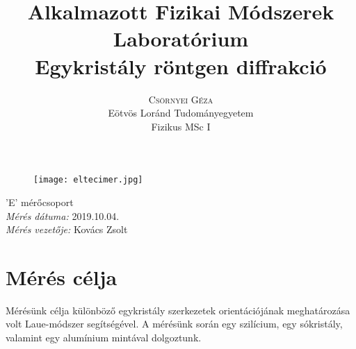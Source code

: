 \documentclass[12pt,a4paper]{article}
\title{\huge{Alkalmazott Fizikai Módszerek Laboratórium}\\ \vspace{20pt}
\textbf{Egykristály röntgen diffrakció}}
\author{\Large{\textsc{Csörnyei Géza}} \vspace{10pt}\\
	\textrm{Eötvös Loránd Tudományegyetem}\\
	\textrm{Fizikus MSc I}
	}
\date{}
\begin{document}
\addtolength{\voffset}{-1.0cm}
\addtolength{\textheight}{1.0cm}
\begin{titlepage}
\maketitle

\begin{figure}[!htb]
\centering
\texttt{[image: eltecimer.jpg]}
\end{figure}

\hfil \Large{'E' mérőcsoport}\hfil  \\
\vspace*{2pt}
\hfil \Large{\emph{Mérés dátuma:} 2019.10.04.}\hfil \\
\vspace*{2pt}
\hfil \hspace*{45pt} \Large{\emph{Mérés vezetője:} Kovács Zsolt}\hfil
\thispagestyle{empty}
\end{titlepage}

\section{Mérés célja}
\hspace*{10pt} Mérésünk célja különböző egykristály szerkezetek orientációjának meghatározása volt Laue-módszer segítségével. A mérésünk során egy szilícium, egy sókristály, valamint egy alumínium mintával dolgoztunk.
\end{document}
